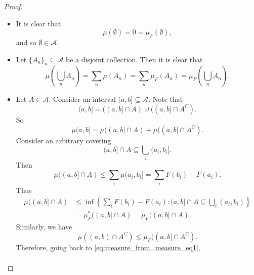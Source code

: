 \documentclass[notoc,notitlepage]{tufte-book}
\begin{document}
\begin{proof}
  \noindent
  \begin{itemize}
    \item It is clear that
      \begin{equation*}
        \mu(\emptyset) = 0 = \mu_F(\emptyset),
      \end{equation*}
      and so $\emptyset \in \mathcal{A}$.
    \item Let $\{ A_n \}_n \subseteq \mathcal{A}$ be a disjoint collection.
      Then it is clear that
      \begin{equation*}
        \mu \left( \bigcup_{n} A_n \right)
        = \sum_{n} \mu(A_n) = \sum_{n} \mu_F(A_n)
        = \mu_F \left( \bigcup_{n} A_n \right).
      \end{equation*}

    \item Let $A \in \mathcal{A}$. Consider an interval
      $(a, b] \subseteq \mathcal{A}$.
      Note that
      \begin{equation*}
        (a, b] = ( (a, b] \cap A ) \cupdot ( (a, b] \cap A^C ).
      \end{equation*}
      So
      \begin{equation}\label{eq:measure_from_measure_eq1}
        \mu(a, b] = \mu( (a, b] \cap A ) + \mu( (a, b] \cap A^C ).
      \end{equation}
      Consider an arbitrary covering
      \begin{equation*}
        (a, b] \cap A \subseteq \bigcup_{i} (a_i, b_i].
      \end{equation*}
      Then
      \begin{equation*}
        \mu( (a, b] \cap A ) \leq \sum_{i} \mu(a_i, b_i]
                        = \sum_{i} F(b_i) - F(a_i).
      \end{equation*}
      Thus
      \begin{align*}
        \mu( (a, b] \cap A )
        &\leq \inf \left\{ \sum_{i} F(b_i) - F(a_i)
                  : (a, b] \cap A \subseteq \bigcup_{i} (a_i, b_i) \right\} \\
        &= \mu_F^*( (a, b] \cap A ) = \mu_F( (a, b] \cap A ).
      \end{align*}
      Similarly, we have
      \begin{equation*}
        \mu( (a, b) \cap A^C ) \leq \mu_F( (a, b] \cap A^C ).
      \end{equation*}
      Therefore, going back to \cref{eq:measure_from_measure_eq1},
      \begin{align*}

\end{align*}
\end{itemize}
\end{proof}
\end{document}
